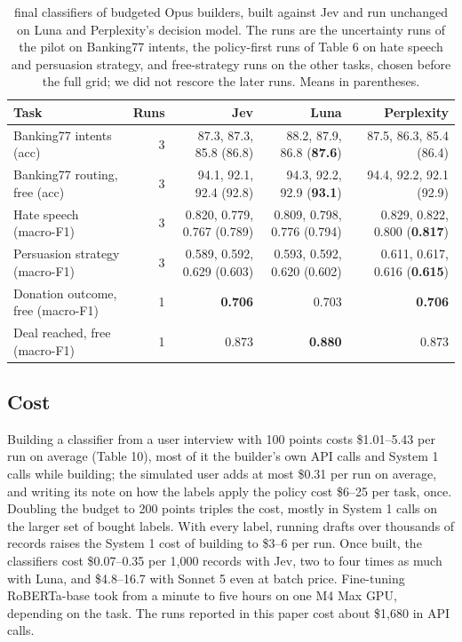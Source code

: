 \documentclass[11pt]{article}
\begin{document}
\begin{table}[t]
\centering\small\setlength{\tabcolsep}{3.5pt}
\begin{tabularx}{\textwidth}{lRRRR}
\toprule
Task & Runs & Jev & Luna & Perplexity \\
\midrule
Banking77 intents (acc) & 3 & 87.3, 87.3, 85.8 (86.8) & 88.2, 87.9, 86.8 (\textbf{87.6}) & 87.5, 86.3, 85.4 (86.4) \\
Banking77 routing, free (acc) & 3 & 94.1, 92.1, 92.4 (92.8) & 94.3, 92.2, 92.9 (\textbf{93.1}) & 94.4, 92.2, 92.1 (92.9) \\
Hate speech (macro-F1) & 3 & 0.820, 0.779, 0.767 (0.789) & 0.809, 0.798, 0.776 (0.794) & 0.829, 0.822, 0.800 (\textbf{0.817}) \\
Persuasion strategy (macro-F1) & 3 & 0.589, 0.592, 0.629 (0.603) & 0.593, 0.592, 0.620 (0.602) & 0.611, 0.617, 0.616 (\textbf{0.615}) \\
Donation outcome, free (macro-F1) & 1 & \textbf{0.706} & 0.703 & \textbf{0.706} \\
Deal reached, free (macro-F1) & 1 & 0.873 & \textbf{0.880} & 0.873 \\
\bottomrule
\end{tabularx}
\caption{final classifiers of budgeted Opus builders, built against Jev and run unchanged on Luna and Perplexity's decision model. The runs are the uncertainty runs of the pilot on Banking77 intents, the policy-first runs of Table 6 on hate speech and persuasion strategy, and free-strategy runs on the other tasks, chosen before the full grid; we did not rescore the later runs. Means in parentheses.}
\label{tab:9}
\end{table}

\subsection{Cost}

Building a classifier from a user interview with 100 points costs \$1.01--5.43 per run on average (Table 10), most of it the builder's own API calls and System 1 calls while building; the simulated user adds at most \$0.31 per run on average, and writing its note on how the labels apply the policy cost \$6--25 per task, once. Doubling the budget to 200 points triples the cost, mostly in System 1 calls on the larger set of bought labels. With every label, running drafts over thousands of records raises the System 1 cost of building to \$3--6 per run. Once built, the classifiers cost \$0.07--0.35 per 1,000 records with Jev, two to four times as much with Luna, and \$4.8--16.7 with Sonnet 5 even at batch price. Fine-tuning RoBERTa-base took from a minute to five hours on one M4 Max GPU, depending on the task. The runs reported in this paper cost about \$1,680 in API calls.
\end{document}
